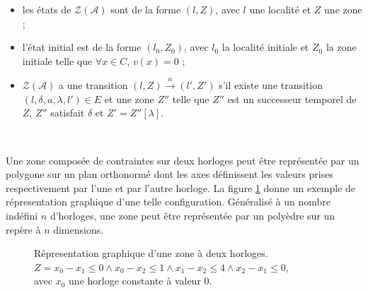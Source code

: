 \documentclass{article}
\begin{document}
        \begin{itemize}
          \item les états de $\mathcal{Z}(\mathcal{A})$ sont de la forme
            $(l,Z)$, avec $l$ une localité et $Z$ une zone ;
          \item l'état initial est de la forme $(l_0,Z_0)$, avec $l_0$ la
            localité initiale et $Z_0$ la zone initiale telle que $\forall x \in
            C$, $v(x) = 0$ ;
          \item $\mathcal{Z}(\mathcal{A})$ a une transition
            $(l,Z)\xrightarrow{a}(l',Z')$ s'il existe une transition
            $(l,\delta,a,\lambda,l') \in E$ et une zone $Z''$ telle que $Z''$
            est un successeur temporel de $Z$, $Z''$ satisfait $\delta$ et $Z' =
            Z''[\lambda]$.
        \end{itemize}
        ~

        Une zone composée de contraintes sur deux horloges peut être représentée
        par un polygone sur un plan orthonormé dont les axes définissent les
        valeurs prises respectivement par l'une et par l'autre horloge. La
        figure \ref{fig:representation-zone} donne un exemple de répresentation
        graphique d'une telle configuration. Généralisé à un nombre indéfini
        $n$ d'horloges, une zone peut être représentée par un polyèdre sur un
        repère à $n$ dimensions.

        \begin{figure}
          \centering
          \caption{Répresentation graphique d'une zone à deux horloges. \\
            $Z = x_0 - x_1 \leq 0 \wedge x_0 - x_2 \leq 1 \wedge x_1 - x_2 \leq
            4 \wedge x_2 - x_1 \leq 0$, \\
            avec $x_0$ une horloge constante à valeur $0$.}
          \label{fig:representation-zone}
        \end{figure}
\end{document}
